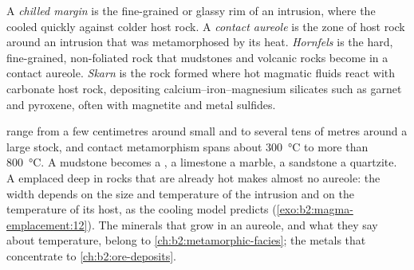 \begin{definition}\label{def:b2:magma-emplacement:aureole}
A \emph{chilled margin} is the fine-grained or glassy rim of an
intrusion, where the  cooled quickly against colder host rock. A
\emph{contact aureole} is the zone of host rock around an
intrusion that was metamorphosed by its heat. \emph{Hornfels} is the
hard, fine-grained, non-foliated rock that mudstones and volcanic rocks become in
a contact aureole. \emph{Skarn} is the rock formed where hot magmatic
fluids react with carbonate host rock, depositing calcium--iron--magnesium
silicates such as garnet and pyroxene, often with magnetite and metal sulfides.
\end{definition}

 range from a few centimetres around small  and  to
several tens of metres around a large stock, and contact metamorphism spans
about \qty{300}{\celsius} to more than \qty{800}{\celsius}. A mudstone becomes a
, a limestone a marble, a sandstone a quartzite. A  emplaced deep
in rocks that are already hot makes almost no aureole: the width depends on the
size and temperature of the intrusion and on the temperature of its host, as
the cooling model predicts (\cref{exo:b2:magma-emplacement:12}). The minerals that grow in an aureole,
and what they say about temperature, belong to \cref{ch:b2:metamorphic-facies};
the metals that  concentrate to \cref{ch:b2:ore-deposits}.

